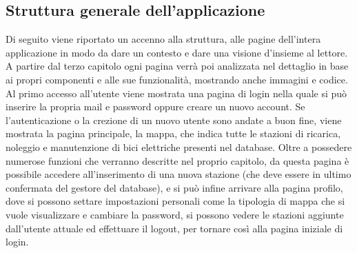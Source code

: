 	\subsection{Struttura generale dell'applicazione}
	Di seguito viene riportato un accenno alla struttura, alle pagine
	dell'intera applicazione in modo da dare un contesto e dare una visione
	d'insieme al lettore. A partire dal terzo capitolo ogni pagina verrà poi
	analizzata nel dettaglio in base ai propri componenti e alle sue
	funzionalità, mostrando anche immagini e codice. \newline
	Al primo accesso all'utente viene mostrata una pagina di login nella quale
	si può inserire la propria mail e password oppure creare un nuovo account.
	Se l'autenticazione o la crezione di un nuovo utente sono andate a buon
	fine, viene mostrata la pagina principale, la mappa, che indica tutte le
	stazioni di ricarica, noleggio e manutenzione di bici elettriche presenti
	nel database. Oltre a possedere numerose funzioni che verranno descritte nel
	proprio capitolo, da questa pagina è possibile accedere all'inserimento di
	una nuova stazione (che deve essere in ultimo confermata del gestore del
	database), e si può infine arrivare alla pagina profilo, dove si possono
	settare impostazioni personali come la tipologia di mappa che si vuole
	visualizzare e cambiare la password, si possono vedere le stazioni aggiunte
	dall'utente attuale ed effettuare il logout, per tornare così alla pagina
	iniziale di login. 	
	
%